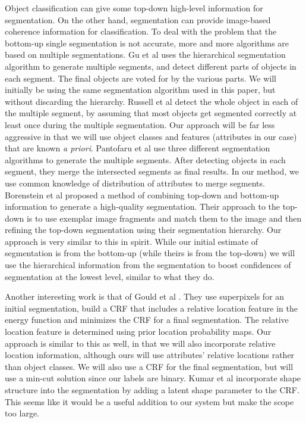 \documentclass[10pt,twocolumn,letterpaper]{article}
\begin{document}
Object classification can give some top-down high-level information
for segmentation. On the other hand, segmentation can provide
image-based coherence information for classification. To deal with
the problem that the bottom-up single segmentation is not accurate,
more and more algorithms are based on multiple segmentations. Gu et
al \cite{gu09} uses the hierarchical segmentation algorithm to
generate multiple segments, and detect different parts of objects in
each segment. The final objects are voted for by the various parts.
We will initially be using the same segmentation algorithm used in
this paper, but without discarding the hierarchy.
Russell et al \cite{russell06} detect the whole object in each of
the multiple segment, by assuming that most objects get segmented
correctly at least once during the multiple segmentation. Our approach
will be far less aggressive in that we will use object classes and 
features (attributes in our case) that are known \emph{a priori}.
Pantofaru et
al \cite{pantofaru} use three different segmentation algorithms to
generate the multiple segments. After detecting objects in each
segment, they merge the intersected segments as final results. In
our method, we use common knowledge of distribution of attributes to
merge segments.
Borenstein et al \cite{borenstein04} proposed a method of combining top-down
and bottom-up information to generate a high-quality segmentation.  Their
approach to the top-down is to use exemplar image fragments and match them
to the image and then refining the top-down segmentation using their
segmentation hierarchy.  Our approach is very similar to this in spirit.
While our initial estimate of segmentation is from the bottom-up (while
theirs is from the top-down) we will use the hierarchical information
from the segmentation to boost confidences of segmentation at the lowest
level, similar to what they do.

Another interesting work is that of Gould et al \cite{gould08}.  They use
superpixels for an initial segmentation, build a CRF that includes a
relative location feature in the energy function and minimizes the CRF
for a final segmentation.  The relative location feature is determined
using prior location probability maps.  Our approach is similar to this
as well, in that we will also incorporate relative location information,
although ours will use attributes' relative locations rather than object
classes.  We will also use a CRF for the final segmentation, but will
use a min-cut solution since our labels are binary.
Kumar et al \cite{kumar05} incorporate shape structure into the segmentation by
adding a latent shape parameter to the CRF.  This seems like it would be
a useful addition to our system but make the scope too large.
\end{document}
